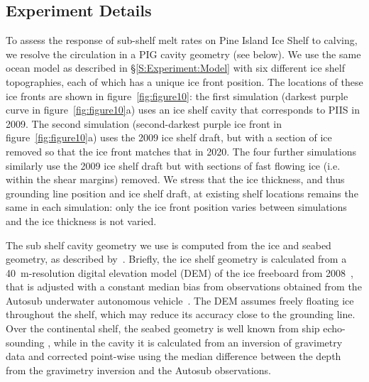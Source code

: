 \documentclass[draft]{agujournal2019}
\begin{document}
\subsection{Experiment Details}
To assess the response of sub-shelf melt rates on Pine Island Ice Shelf to calving, we resolve the circulation in a PIG cavity geometry (see below). We use the same ocean model as described in \S\ref{S:Experiment:Model} with six different ice shelf topographies, each of which has a unique ice front position. The locations of these ice fronts are shown in figure~\ref{fig:figure10}: the first simulation (darkest purple curve in figure~\ref{fig:figure10}a) uses an ice shelf cavity that corresponds to PIIS in 2009. The second simulation (second-darkest purple ice front in figure~\ref{fig:figure10}a) uses the 2009 ice shelf draft, but with a section of ice removed so that the ice front matches that in 2020. The four further simulations similarly use the 2009 ice shelf draft but with sections of fast flowing ice (i.e. within the shear margins) removed. We stress that the ice thickness, and thus grounding line position and ice shelf draft, at existing shelf locations remains the same in each simulation: only the ice front position varies between simulations and the ice thickness is not varied.  %

The sub shelf cavity geometry we use is computed from the ice and seabed geometry, as described by~. Briefly, the ice shelf geometry is calculated from a 40~m-resolution digital elevation model (DEM) of the ice freeboard from 2008~\cite{Korona2009Photogrammetry}, that is adjusted with a constant median bias from observations obtained from the Autosub underwater autonomous vehicle~\cite{Jenkins2010NatureGeo}. The DEM assumes freely floating ice throughout the shelf, which may reduce its accuracy close to the grounding line. Over the continental shelf, the seabed geometry is well known from ship echo-sounding \cite{Dutrieux2014Science}, while in the cavity it is calculated from an inversion of gravimetry data and corrected point-wise using the median difference between the depth from the gravimetry inversion and the Autosub observations. 
\end{document}
